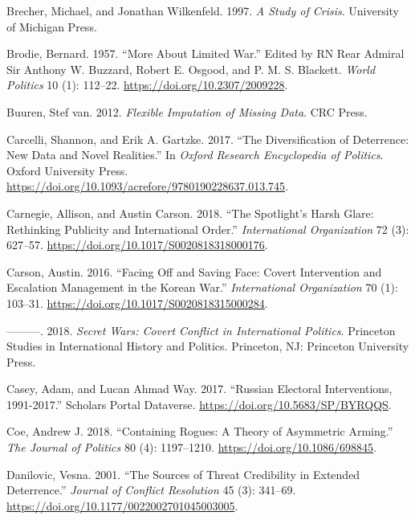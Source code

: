 \documentclass[
]{article}
\begin{document}
\leavevmode\hypertarget{ref-brecher_studycrisis_1997}{}%
Brecher, Michael, and Jonathan Wilkenfeld. 1997. \emph{A Study of Crisis}. University of Michigan Press.

\leavevmode\hypertarget{ref-brodie_morelimitedwar_1957}{}%
Brodie, Bernard. 1957. ``More About Limited War.'' Edited by RN Rear Admiral Sir Anthony W. Buzzard, Robert E. Osgood, and P. M. S. Blackett. \emph{World Politics} 10 (1): 112--22. \url{https://doi.org/10.2307/2009228}.

\leavevmode\hypertarget{ref-buuren_flexibleimputationmissing_2012}{}%
Buuren, Stef van. 2012. \emph{Flexible Imputation of Missing Data}. CRC Press.

\leavevmode\hypertarget{ref-carcelli_diversificationdeterrencenew_2017}{}%
Carcelli, Shannon, and Erik A. Gartzke. 2017. ``The Diversification of Deterrence: New Data and Novel Realities.'' In \emph{Oxford Research Encyclopedia of Politics}. Oxford University Press. \url{https://doi.org/10.1093/acrefore/9780190228637.013.745}.

\leavevmode\hypertarget{ref-carnegie_spotlightharshglare_2018}{}%
Carnegie, Allison, and Austin Carson. 2018. ``The Spotlight's Harsh Glare: Rethinking Publicity and International Order.'' \emph{International Organization} 72 (3): 627--57. \url{https://doi.org/10.1017/S0020818318000176}.

\leavevmode\hypertarget{ref-carson_facingsavingface_2016}{}%
Carson, Austin. 2016. ``Facing Off and Saving Face: Covert Intervention and Escalation Management in the Korean War.'' \emph{International Organization} 70 (1): 103--31. \url{https://doi.org/10.1017/S0020818315000284}.

\leavevmode\hypertarget{ref-carson_secretwarscovert_2018}{}%
---------. 2018. \emph{Secret Wars: Covert Conflict in International Politics}. Princeton Studies in International History and Politics. Princeton, NJ: Princeton University Press.

\leavevmode\hypertarget{ref-casey_russianelectoralinterventions_2017}{}%
Casey, Adam, and Lucan Ahmad Way. 2017. ``Russian Electoral Interventions, 1991-2017.'' Scholars Portal Dataverse. \url{https://doi.org/10.5683/SP/BYRQQS}.

\leavevmode\hypertarget{ref-coe_containingroguestheory_2018}{}%
Coe, Andrew J. 2018. ``Containing Rogues: A Theory of Asymmetric Arming.'' \emph{The Journal of Politics} 80 (4): 1197--1210. \url{https://doi.org/10.1086/698845}.

\leavevmode\hypertarget{ref-danilovic_sourcesthreatcredibility_2001}{}%
Danilovic, Vesna. 2001. ``The Sources of Threat Credibility in Extended Deterrence.'' \emph{Journal of Conflict Resolution} 45 (3): 341--69. \url{https://doi.org/10.1177/0022002701045003005}.
\end{document}
